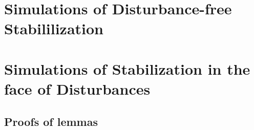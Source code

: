 \documentclass[a4paper,11pt,twoside]{book}
\begin{document}
    
    
    

  \chapter{Simulations of Disturbance-free Stabililization}
    \label{chapter:simulations_without_disturbances}

    
    
    
    

  \chapter{Simulations of Stabilization in the face of Disturbances}
    \label{chapter:simulations_with_disturbances}

    
    
    
    


\begin{appendices}

  \chapter{Proofs of lemmas}
    \label{chapter:proofs_of_lemmas}

    
    
    
    
    
    
    
    \cleardoublepage
\end{appendices}




\end{document}
